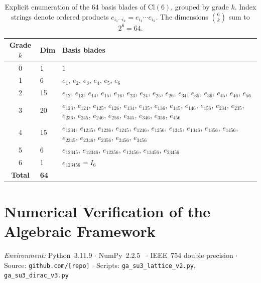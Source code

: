 \documentclass[12pt]{article}
\newcommand{\cl}{\mathrm{Cl}}          %
\begin{document}
\begin{table}[ht]
\centering
\caption{Explicit enumeration of the 64 basis blades of $\cl(6)$,
grouped by grade $k$.  Index strings denote ordered products
$e_{i_1\cdots i_k} = e_{i_1}\cdots e_{i_k}$.  The dimensions
$\binom{6}{k}$ sum to $2^6 = 64$.}
\label{tab:A1}
\begin{tabular}{@{}cl p{}@{}}
  \toprule
  \textbf{Grade $k$} & \textbf{Dim} & \textbf{Basis blades} \\
  \midrule
  0 & 1  & $1$ \\
  1 & 6  & $e_{1}$, $e_{2}$, $e_{3}$, $e_{4}$, $e_{5}$, $e_{6}$ \\
  2 & 15 & $e_{12}$, $e_{13}$, $e_{14}$, $e_{15}$, $e_{16}$, $e_{23}$,
            $e_{24}$, $e_{25}$, $e_{26}$, $e_{34}$, $e_{35}$, $e_{36}$,
            $e_{45}$, $e_{46}$, $e_{56}$ \\
  3 & 20 & $e_{123}$, $e_{124}$, $e_{125}$, $e_{126}$, $e_{134}$,
            $e_{135}$, $e_{136}$, $e_{145}$, $e_{146}$, $e_{156}$,
            $e_{234}$, $e_{235}$, $e_{236}$, $e_{245}$, $e_{246}$,
            $e_{256}$, $e_{345}$, $e_{346}$, $e_{356}$, $e_{456}$ \\
  4 & 15 & $e_{1234}$, $e_{1235}$, $e_{1236}$, $e_{1245}$, $e_{1246}$,
            $e_{1256}$, $e_{1345}$, $e_{1346}$, $e_{1356}$, $e_{1456}$,
            $e_{2345}$, $e_{2346}$, $e_{2356}$, $e_{2456}$, $e_{3456}$ \\
  5 & 6  & $e_{12345}$, $e_{12346}$, $e_{12356}$, $e_{12456}$,
            $e_{13456}$, $e_{23456}$ \\
  6 & 1  & $e_{123456} = I_6$ \\
  \midrule
  \textbf{Total} & \textbf{64} & \\
  \bottomrule
\end{tabular}
\end{table}

\section{Numerical Verification of the Algebraic Framework}
\label{app:B}
\setcounter{table}{0}

\noindent
\textit{Environment:} Python~3.11.9 $\cdot$ NumPy~2.2.5~\cite{Harris2020}
$\cdot$ IEEE~754 double precision $\cdot$
Source: \texttt{github.com/[repo]} $\cdot$
Scripts: \texttt{ga\_su3\_lattice\_v2.py},
\texttt{ga\_su3\_dirac\_v3.py}

\bigskip
\end{document}
